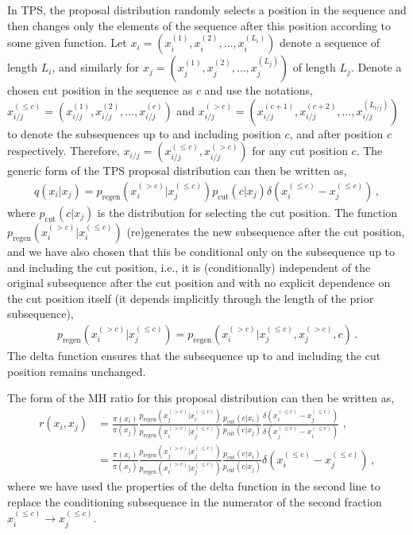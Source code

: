 \documentclass{article}
\begin{document}
In TPS, the proposal distribution randomly selects a position in the sequence and then changes only the elements of the sequence after this position according to some given function.
Let $x_{i} = (x_i^{(1)}, x_i^{(2)}, \ldots, x_i^{(L_i)})$ denote a sequence of length $L_i$, and similarly for
$x_{j} = (x_j^{(1)}, x_j^{(2)}, \ldots, x_j^{(L_j)})$ of length $L_j$. Denote a chosen cut position in the sequence as $c$ and use the notations, $x_{i/j}^{(\le c)} = (x_{i/j}^{(1)}, x_{i/j}^{(2)}, \ldots, x_{i/j}^{(c)})$ and
$x_{i/j}^{(> c)} = (x_{i/j}^{(c+1)}, x_{i/j}^{(c+2)}, \ldots, x_{i/j}^{(L_{i/j})})$ to denote the subsequences up to and including position $c$, and after position $c$ respectively. Therefore, $x_{i/j} = (x_{i/j}^{(\le c)}, x_{i/j}^{(> c)})$ for any cut position $c$.
The generic form of the TPS proposal distribution can then be written as,
\begin{align}
    q(x_{i} | x_{j}) = p_{\text{regen}}(x_{i}^{(> c)} | x_{j}^{(\le c)}) p_{\text{cut}}(c | x_{j}) \delta(x_{i}^{(\le c)} - x_{j}^{(\le c)}) \,,
\end{align}
where $p_{\text{cut}}(c | x_{j})$ is the distribution for selecting the cut position. The function $p_{\text{regen}}(x_{i}^{(> c)} | x_{i}^{(\le c)})$ (re)generates the new subsequence after the cut position,
and we have also chosen that this be conditional only on the subsequence up to and including the cut position, i.e., it is (conditionally)
independent of the original subsequence after the cut position and with no explicit dependence on the cut position itself (it depends implicitly through the length of the prior subsequence),
\begin{align}
    p_{\text{regen}}(x_{i}^{(> c)} | x_{j}^{(\le c)}) = p_{\text{regen}}(x_{i}^{(> c)} | x_{j}^{(\le c)}, x_{j}^{(> c)}, c) \,.
    \label{eq:tps_regen_independence}
\end{align}
The delta function ensures that the subsequence up to and including the cut position remains unchanged.

The form of the MH ratio for this proposal distribution can then be written as,
\begin{align}
    r(x_{i}, x_{j}) & = \frac{\pi(x_{i})}{\pi(x_{j})} \frac{p_{\text{regen}}(x_{j}^{(> c)} | x_{i}^{(\le c)})}{p_{\text{regen}}(x_{i}^{(> c)} | x_{j}^{(\le c)})} \frac{p_{\text{cut}}(c | x_{i})}{p_{\text{cut}}(c | x_{j})} \frac{\delta(x_{i}^{(\le c)} - x_{j}^{(\le c)})}{\delta(x_{j}^{(\le c)} - x_{i}^{(\le c)})} \,\,, \\
                    & = \frac{\pi(x_{i})}{\pi(x_{j})} \frac{p_{\text{regen}}(x_{j}^{(> c)} | x_{j}^{(\le c)})}{p_{\text{regen}}(x_{i}^{(> c)} | x_{j}^{(\le c)})} \frac{p_{\text{cut}}(c | x_{i})}{p_{\text{cut}}(c | x_{j})} \delta(x_{i}^{(\le c)} - x_{j}^{(\le c)}) \,,
\end{align}
where we have used the properties of the delta function in the second line to replace the conditioning subsequence in the numerator of the second fraction $x_{i}^{(\le c)} \to x_{j}^{(\le c)}$.
\end{document}
